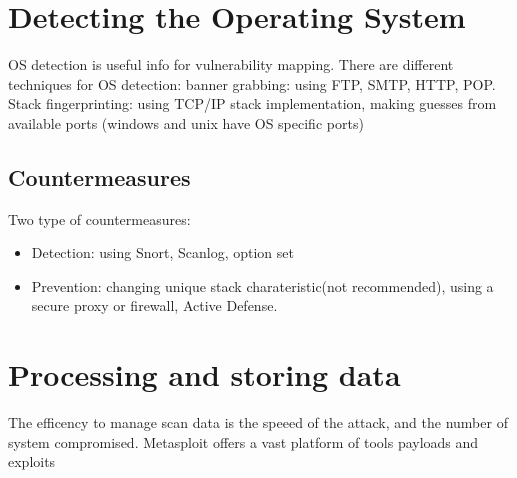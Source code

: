 \section{Detecting the Operating System}
OS detection is useful info for vulnerability mapping.
There are different techniques for OS detection: banner grabbing: using FTP, SMTP, HTTP, POP.
Stack fingerprinting: using TCP/IP stack implementation, making guesses from available ports (windows and unix have OS specific ports)


\subsection{Countermeasures}
Two type of countermeasures:
\begin{itemize}
    \item Detection: using Snort, Scanlog, option set
    \item Prevention: changing unique stack charateristic(not recommended), using a secure proxy or firewall, Active Defense.
\end{itemize}

\section{Processing and storing data}
The efficency to manage scan data is the speeed of the attack, and the number of system compromised.
Metasploit offers a vast platform of tools payloads and exploits